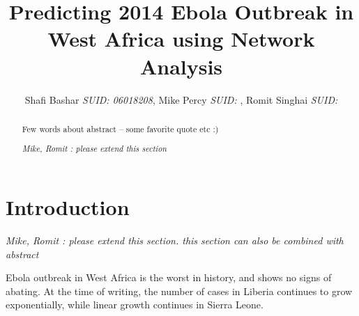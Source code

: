 \documentclass[12pt, journal,onecolumn]{IEEEtran}
\begin{document}
\title{Predicting 2014 Ebola Outbreak in West Africa using Network Analysis}
\author{Shafi Bashar {\em SUID: 06018208}, Mike Percy {\em  SUID: }, Romit  Singhai {\em  SUID: }
}
\maketitle

\begin{abstract}
Few words about abstract -- some favorite quote etc :)

\em{Mike, Romit : please extend this section}
\end{abstract}



\section{Introduction}
\label{sec:introduction}
{\em{Mike, Romit : please extend this section. this section can also be combined with abstract}}

\bigskip
{} Ebola outbreak in West Africa is the worst in history, and shows no signs
of abating. At the time of writing, the number of cases in Liberia continues to grow exponentially,
while linear growth continues in Sierra Leone.
\end{document}
